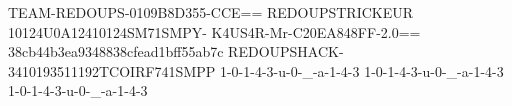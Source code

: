 TEAM-REDOUPS-0109B8D355-CCE==
REDOUPSTRICKEUR 10124U0A12410124SM71SMPY-
K4US4R-Mr-C20EA848FF-2.0==
38cb44b3ea9348838cfead1bff55ab7c
REDOUPSHACK-3410193511192TCOIRF741SMPP
1-0-1-4-3-u-0-_-a-1-4-3
1-0-1-4-3-u-0-_-a-1-4-3
1-0-1-4-3-u-0-_-a-1-4-3
